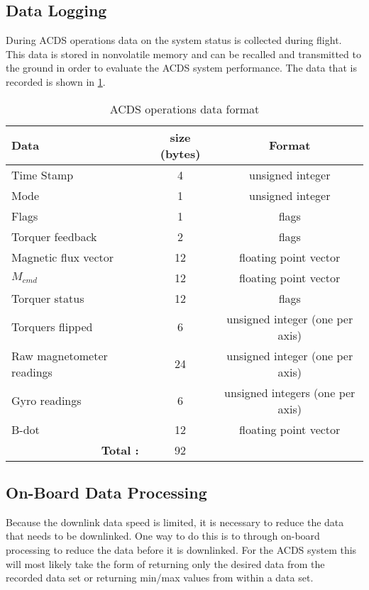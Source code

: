 \subsection{Data Logging}

During \ac{ACDS} operations data on the system status is collected during flight. This data is stored in nonvolatile memory and can be recalled and transmitted to the ground in order to evaluate the \ac{ACDS} system performance. The data that is recorded is shown in \cref{tab:logdat}.

\begin{table}[htb]
    \centering
    \caption{\ac{ACDS} operations data format}
    \label{tab:logdat}
    \begin{tabular}{|l|c|c|}
        \hline
        Data&size (bytes)&Format\\
        \hline
        Time Stamp&4&unsigned integer\\
        \hline
        Mode&1&unsigned integer\\
        \hline
        Flags&1&flags\\
        \hline
        Torquer feedback&2&flags\\
        \hline
        Magnetic flux vector&12&floating point vector\\
        \hline
        $M_{cmd}$&12&floating point vector\\
        \hline
        Torquer status&12&flags\\
        \hline
        Torquers flipped&6&unsigned integer (one per axis)\\
        \hline
        Raw magnetometer readings&24&unsigned integer (one per axis)\\
        \hline
        Gyro readings&6&unsigned integers (one per axis)\\
        \hline
        B-dot&12&floating point vector\\
        \hline
        \multicolumn{1}{|r|}{\bfseries Total :}&92&\\
        \hline
    \end{tabular}
\end{table}

\subsection{On-Board Data Processing}

Because the downlink data speed is limited, it is necessary to reduce the data that needs to be downlinked. One way to do this is to through on-board processing to reduce the data before it is downlinked. For the \ac{ACDS} system this will most likely take the form of returning only the desired data from the recorded data set or returning min/max values from within a data set. 

